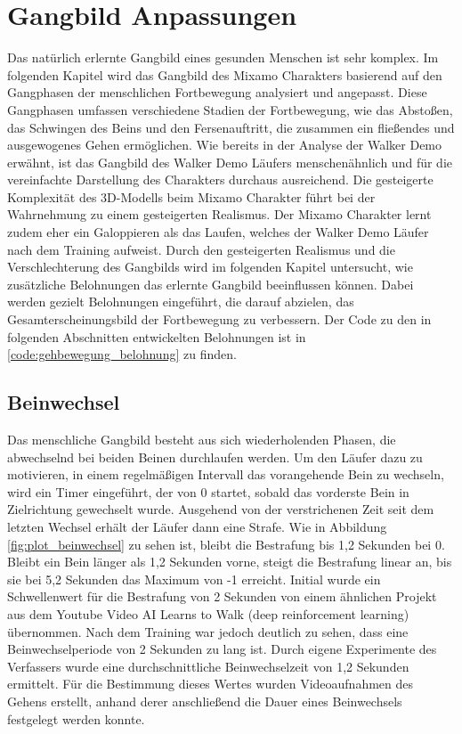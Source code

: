\section{Gangbild Anpassungen}
Das natürlich erlernte Gangbild eines gesunden Menschen ist sehr komplex. Im folgenden Kapitel wird das Gangbild des Mixamo Charakters basierend auf den Gangphasen der menschlichen Fortbewegung analysiert und angepasst. Diese Gangphasen umfassen verschiedene Stadien der Fortbewegung, wie das Abstoßen, das Schwingen des Beins und den Fersenauftritt, die zusammen ein fließendes und ausgewogenes Gehen ermöglichen. Wie bereits in der Analyse der Walker Demo erwähnt, ist das Gangbild des Walker Demo Läufers menschenähnlich und für die vereinfachte Darstellung des Charakters durchaus ausreichend. Die gesteigerte Komplexität des 3D-Modells beim Mixamo Charakter führt bei der Wahrnehmung zu einem gesteigerten Realismus. Der Mixamo Charakter lernt zudem eher ein Galoppieren als das Laufen, welches der Walker Demo Läufer nach dem Training aufweist. Durch den gesteigerten Realismus und die Verschlechterung des Gangbilds wird im folgenden Kapitel untersucht, wie zusätzliche Belohnungen das erlernte Gangbild beeinflussen können. Dabei werden gezielt Belohnungen eingeführt, die darauf abzielen, das Gesamterscheinungsbild der Fortbewegung zu verbessern. Der Code zu den in folgenden Abschnitten entwickelten Belohnungen ist in \ref{code:gehbewegung_belohnung} zu finden.

\subsection{Beinwechsel}
Das menschliche Gangbild besteht aus sich wiederholenden Phasen, die abwechselnd bei beiden Beinen durchlaufen werden. Um den Läufer dazu zu motivieren, in einem regelmäßigen Intervall das vorangehende Bein zu wechseln, wird ein Timer eingeführt, der von 0 startet, sobald das vorderste Bein in Zielrichtung gewechselt wurde. Ausgehend von der verstrichenen Zeit seit dem letzten Wechsel erhält der Läufer dann eine Strafe. Wie in Abbildung \ref{fig:plot_beinwechsel} zu sehen ist, bleibt die Bestrafung bis 1,2 Sekunden bei 0. Bleibt ein Bein länger als 1,2 Sekunden vorne, steigt die Bestrafung linear an, bis sie bei 5,2 Sekunden das Maximum von -1 erreicht. Initial wurde ein Schwellenwert für die Bestrafung von 2 Sekunden von einem ähnlichen Projekt aus dem Youtube Video \grqq{}AI Learns to Walk (deep reinforcement learning)\grqq{} übernommen.\cite{aiwarehouse} Nach dem Training war jedoch deutlich zu sehen, dass eine Beinwechselperiode von 2 Sekunden zu lang ist. Durch eigene Experimente des Verfassers wurde eine durchschnittliche Beinwechselzeit von 1,2 Sekunden ermittelt. Für die Bestimmung dieses Wertes wurden Videoaufnahmen des Gehens erstellt, anhand derer anschließend die Dauer eines Beinwechsels festgelegt werden konnte.

